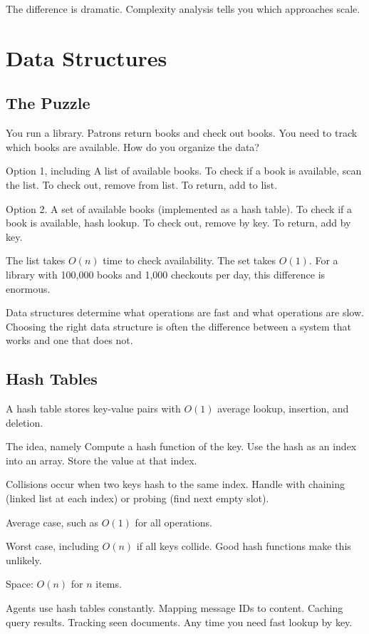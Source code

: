 The difference is dramatic. Complexity analysis tells you which approaches scale.

\section{Data Structures}

\subsection{The Puzzle}

You run a library. Patrons return books and check out books. You need to track which books are available. How do you organize the data?

Option 1, including A list of available books. To check if a book is available, scan the list. To check out, remove from list. To return, add to list.

Option 2. A set of available books (implemented as a hash table). To check if a book is available, hash lookup. To check out, remove by key. To return, add by key.

The list takes $O(n)$ time to check availability. The set takes $O(1)$. For a library with 100,000 books and 1,000 checkouts per day, this difference is enormous.

Data structures determine what operations are fast and what operations are slow. Choosing the right data structure is often the difference between a system that works and one that does not.

\subsection{Hash Tables}

A hash table stores key-value pairs with $O(1)$ average lookup, insertion, and deletion.

The idea, namely Compute a hash function of the key. Use the hash as an index into an array. Store the value at that index.

Collisions occur when two keys hash to the same index. Handle with chaining (linked list at each index) or probing (find next empty slot).

Average case, such as $O(1)$ for all operations.

Worst case, including $O(n)$ if all keys collide. Good hash functions make this unlikely.

Space: $O(n)$ for $n$ items.

Agents use hash tables constantly. Mapping message IDs to content. Caching query results. Tracking seen documents. Any time you need fast lookup by key.


